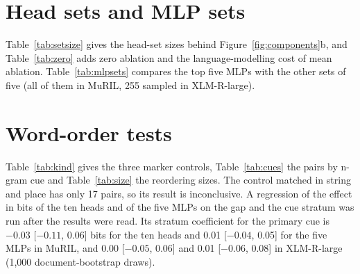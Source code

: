 \documentclass[11pt]{article}
\begin{document}
\section{Head sets and MLP sets}
\label{app:sets}

Table~\ref{tab:setsize} gives the head-set sizes behind Figure~\ref{fig:components}b, and Table~\ref{tab:zero} adds zero ablation and the language-modelling cost of mean ablation.
Table~\ref{tab:mlpsets} compares the top five MLPs with the other sets of five (all of them in MuRIL, 255 sampled in XLM-R-large).

\begin{table}[H]
\centering
\footnotesize
\setlength{\tabcolsep}{1.5pt}

\caption{Faithfulness / necessity (mean ablation) of the top $K$ heads on fresh documents. In word order the sets are drawn from the 60 heads ranked exactly. Random sets: 100 per $K$, 50 at $K=40$.}
\label{tab:setsize}
\end{table}

\begin{table}[H]
\centering
\footnotesize
\setlength{\tabcolsep}{3pt}

\caption{Necessity of the top $K$ heads under zero ablation, and the language-modelling cost of mean ablation (held-out nats per subtoken above the unablated model).}
\label{tab:zero}
\end{table}

\begin{table}[H]
\centering
\footnotesize
\setlength{\tabcolsep}{2.5pt}

\caption{The top five MLPs against the mean of the other sets of five (all in MuRIL, 255 sampled in XLM-R-large), on fresh documents. Rank: the other sets that do better, plus one. MuRIL's agreement necessity is not read, because ablating its top five MLPs costs 5.0 nats, above the 2-nat limit.}
\label{tab:mlpsets}
\end{table}

\FloatBarrier

\section{Word-order tests}
\label{app:wordorder}

Table~\ref{tab:kind} gives the three marker controls, Table~\ref{tab:cues} the pairs by n-gram cue and Table~\ref{tab:size} the reordering sizes.
The control matched in string and place has only 17 pairs, so its result is inconclusive.
A regression of the effect in bits of the ten heads and of the five MLPs on the gap and the cue stratum was run after the results were read.
Its stratum coefficient for the primary cue is $-0.03$ [$-0.11$, 0.06] bits for the ten heads and 0.01 [$-0.04$, 0.05] for the five MLPs in MuRIL, and 0.00 [$-0.05$, 0.06] and 0.01 [$-0.06$, 0.08] in XLM-R-large (1,000 document-bootstrap draws).
\end{document}
